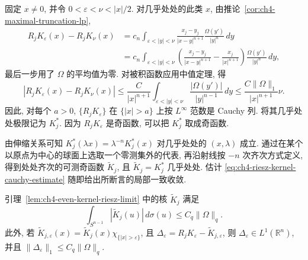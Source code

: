 \begin{Proof}
固定 $x\ne0$, 并令 $0<\varepsilon<\nu<|x|/2$. 对几乎处处的此类 $x$, 由推论~\ref{cor:ch4-maximal-truncation-lp},
\[
\begin{aligned}
 R_jK_\varepsilon(x)-R_jK_\nu(x)
 &=c_n\int_{\varepsilon<|y|<\nu}
 \frac{x_j-y_j}{|x-y|^{n+1}}\frac{\Omega(y')}{|y|^n}\,dy\\
 &=c_n\int_{\varepsilon<|y|<\nu}
 \left(\frac{x_j-y_j}{|x-y|^{n+1}}-\frac{x_j}{|x|^{n+1}}\right)
 \frac{\Omega(y')}{|y|^n}\,dy,
\end{aligned}
\]
最后一步用了 $\Omega$ 的平均值为零. 对被积函数应用中值定理, 得
\begin{equation}
\label{eq:ch4-riesz-kernel-cauchy-estimate}
 |R_jK_\varepsilon(x)-R_jK_\nu(x)|
 \le\frac{C}{|x|^{n+1}}
 \int_{\varepsilon<|y|<\nu}\frac{|\Omega(y')|}{|y|^{n-1}}\,dy
 \le\frac{C\|\Omega\|_1}{|x|^{n+1}}\nu.
\end{equation}
因此, 对每个 $a>0$, $\{R_jK_\varepsilon\}$ 在 $\{|x|>a\}$ 上按 $L^\infty$ 范数是 Cauchy 列. 将其几乎处处极限记为 $K_j^*$. 因为 $R_jK_\varepsilon$ 是奇函数, 可以把 $K_j^*$ 取成奇函数.

由伸缩关系可知 $K_j^*(\lambda x)=\lambda^{-n}K_j^*(x)$ 对几乎处处的 $(x,\lambda)$ 成立. 通过在某个以原点为中心的球面上选取一个零测集外的代表, 再沿射线按 $-n$ 次齐次方式定义, 得到处处齐次的可测奇函数 $\widetilde K_j$, 且 $\widetilde K_j=K_j^*$ 几乎处处. 估计 \eqref{eq:ch4-riesz-kernel-cauchy-estimate} 随即给出所断言的局部一致收敛.
\end{Proof}

\hypertarget{chapter-04-page-090}{}
\begin{Lemma}
\label{lem:ch4-even-kernel-l1-estimates}
引理~\ref{lem:ch4-even-kernel-riesz-limit} 中的核 $\widetilde K_j$ 满足
\[
 \int_{S^{n-1}}|\widetilde K_j(u)|\,d\sigma(u)
 \le C_q\|\Omega\|_q.
\]
此外, 若 $\widetilde K_{j,\varepsilon}(x)=\widetilde K_j(x)
\chi_{\{|x|>\varepsilon\}}$, 且
$\Delta_\varepsilon=R_jK_\varepsilon-\widetilde K_{j,\varepsilon}$, 则 $\Delta_\varepsilon\in L^1(\mathbb R^n)$, 并且
$\|\Delta_\varepsilon\|_1\le C_q\|\Omega\|_q$.
\end{Lemma}

